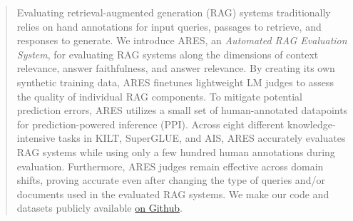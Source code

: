
\begin{abstract}

Evaluating retrieval-augmented generation (RAG) systems traditionally relies on hand annotations for input queries, passages to retrieve, and responses to generate.
We introduce ARES, an \textit{Automated RAG Evaluation System}, for evaluating RAG systems along the dimensions of context relevance, answer faithfulness, and answer relevance.
By creating its own synthetic training data, ARES finetunes lightweight LM judges to assess the quality of individual RAG components.
To mitigate potential prediction errors, ARES utilizes a small set of human-annotated datapoints for prediction-powered inference (PPI).
Across eight different knowledge-intensive tasks in KILT, SuperGLUE, and AIS, ARES accurately evaluates RAG systems while using only a few hundred human annotations during evaluation.
Furthermore, ARES judges remain effective across domain shifts, proving accurate even after changing the type of queries and/or documents used in the evaluated RAG systems. We make our code and datasets publicly available \href{https://github.com/stanford-futuredata/ARES}{on Github}.






\end{abstract}
